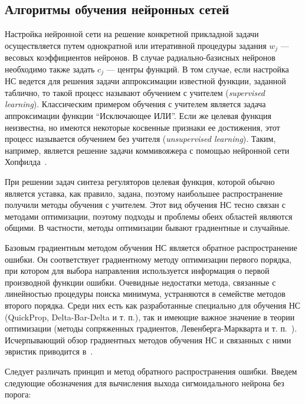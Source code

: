

\subsection{Алгоритмы обучения нейронных сетей}

Настройка нейронной сети на решение конкретной прикладной задачи
осуществляется путем однократной или итеративной процедуры задания
$w_j$ --- весовых коэффициентов нейронов.  В случае радиально-базисных
нейронов необходимо также задать $c_j$ --- центры функций.  В том
случае, если настройка НС ведется для решения задачи аппроксимации
известной функции, заданной таблично, то такой процесс называют
обучением с учителем ({\em supervised learning}).  Классическим
примером обучения с учителем является задача аппроксимации функции
``Исключающее ИЛИ''.  Если же целевая функция неизвестна, но имеются
некоторые косвенные признаки ее достижения, этот процесс называется
обучением без учителя ({\em unsupervised learning}).  Таким, например,
является решение задачи коммивояжера с помощью нейронной сети
Хопфилда~\cite{wasser92}.

При решении задач синтеза регуляторов целевая функция, которой обычно
является уставка, как правило, задана, поэтому наибольшее
распространение получили методы обучения с учителем.  Этот вид
обучения НС тесно связан с методами оптимизации, поэтому подходы и
проблемы обеих областей являются общими.  В частности, методы
оптимизации бывают градиентные и случайные.

Базовым градиентным методом обучения НС является обратное
распространение ошибки.  Он соответствует градиентному методу
оптимизации первого порядка, при котором для выбора направления
используется информация о первой производной функции ошибки.
Очевидные недостатки метода, связанные с линейностью процедуры поиска
минимума, устраняются в семействе методов второго порядка.  Среди них
есть как разработанные специально для обучения НС (QuickProp,
Delta-Bar-Delta и т. п.), так и имеющие важное значение в теории
оптимизации (методы сопряженных градиентов, Левенберга-Маркварта и
т. п.~\cite{himmelblau75}).  Исчерпывающий обзор градиентных методов
обучения НС и связанных с ними эвристик приводится в~\cite{gibb96}.

Следует различать принцип и метод обратного распространения ошибки.
Введем следующие обозначения для вычисления выхода сигмоидального
нейрона без порога:

